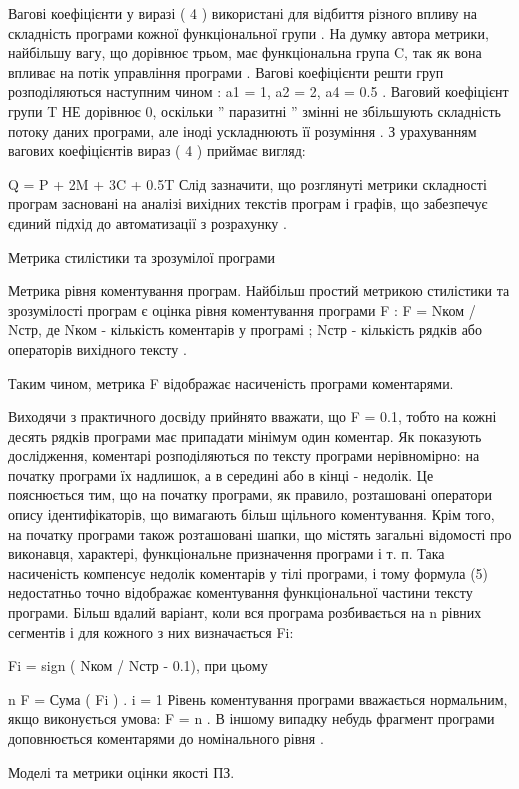 Вагові коефіцієнти у виразі ( 4 ) використані для відбиття різного впливу на складність програми кожної функціональної групи . На думку автора метрики, найбільшу вагу, що дорівнює трьом, має функціональна група C, так як вона впливає на потік управління програми . Вагові коефіцієнти решти груп розподіляються наступним чином : a1 = 1, a2 = 2, a4 = 0.5 . Ваговий коефіцієнт групи T НЕ дорівнює 0, оскільки '' паразитні '' змінні не збільшують складність потоку даних програми, але іноді ускладнюють її розуміння . З урахуванням вагових коефіцієнтів вираз ( 4 ) приймає вигляд:

Q = P + 2M + 3C + 0.5T
Слід зазначити, що розглянуті метрики складності програм засновані на аналізі вихідних текстів програм і графів, що забезпечує єдиний підхід до автоматизації з розрахунку .


Метрика стилістики та зрозумілої програми

Метрика рівня коментування програм.
Найбільш простий метрикою стилістики та зрозумілості програм є оцінка рівня коментування програми F :
F = Nком / Nстр, 
де Nком - кількість коментарів у програмі ; Nстр - кількість рядків або операторів вихідного тексту .

Таким чином, метрика F відображає насиченість програми коментарями.

Виходячи з практичного досвіду прийнято вважати, що F = 0.1, тобто на кожні десять рядків програми має припадати мінімум один коментар. Як показують дослідження, коментарі розподіляються по тексту програми нерівномірно: на початку програми їх надлишок, а в середині або в кінці - недолік. Це пояснюється тим, що на початку програми, як правило, розташовані оператори опису ідентифікаторів, що вимагають більш щільного коментування. Крім того, на початку програми також розташовані шапки, що містять загальні відомості про виконавця, характері, функціональне призначення програми і т. п. Така насиченість компенсує недолік коментарів у тілі програми, і тому формула (5) недостатньо точно відображає коментування функціональної частини тексту програми.
Більш вдалий варіант, коли вся програма розбивається на n рівних сегментів і для кожного з них визначається Fi:

Fi = sign ( Nком / Nстр - 0.1),
при цьому

n
F = Сума ( Fi ) .
i = 1
Рівень коментування програми вважається нормальним, якщо виконується умова: F = n . В іншому випадку небудь фрагмент програми доповнюється коментарями до номінального рівня .

Моделі та метрики оцінки якості ПЗ.

